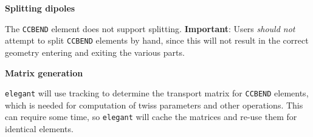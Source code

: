 {\bf Splitting dipoles}

The \verb|CCBEND| element does not support splitting.
{\bf Important}: Users {\em should not} attempt to split \verb|CCBEND| elements by hand, since this
will not result in the correct geometry entering and exiting the various parts.

{\bf Matrix generation}

{\tt elegant} will use tracking to determine the transport matrix for \verb|CCBEND| elements, which 
is needed for computation of twiss parameters and other operations.
This can require some time, so {\tt elegant} will cache the matrices and re-use them for
identical elements.

